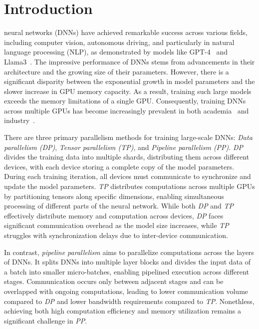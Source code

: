 \section{Introduction}
 neural networks (DNNs) have achieved remarkable success across various fields,
including computer vision, autonomous driving, and particularly in natural language processing (NLP),
as demonstrated by models like GPT-4~\cite{achiam2023gpt} and Llama3~\cite{dubey2024llama}.
The impressive performance of DNNs stems from advancements in their architecture
and the growing size of their parameters.
However, there is a significant disparity between the exponential growth in model parameters
and the slower increase in GPU memory capacity.
As a result, training such large models exceeds the memory limitations of a single GPU.
Consequently, training DNNs across multiple GPUs has become increasingly
prevalent in both academia~\cite{miao2023hetu,zhengAlpaAutomatingInter2022} and industry~\cite{abadiTensorFlowSystemLargeScale2016,paszkePytorchImperativeStyle2019}.

There are three primary parallelism methods for training large-scale DNNs:
\emph{Data parallelism (DP)}, \emph{Tensor parallelism (TP)}, and \emph{Pipeline parallelism (PP)}.
\emph{DP} divides the training data into multiple shards,
distributing them across different devices, with each device storing a complete copy of the model parameters.
During each training iteration, all devices must communicate to synchronize and update the model parameters.
\emph{TP} distributes computations across multiple GPUs by partitioning tensors along specific dimensions,
enabling simultaneous processing of different parts of the neural network.
While both \emph{DP} and \emph{TP} effectively distribute memory and computation across devices,
\emph{DP} faces significant communication overhead as the model size increases,
while \emph{TP} struggles with synchronization delays due to inter-device communication.

In contrast, \emph{pipeline parallelism} aims to parallelize computations across the layers of DNNs.
It splits DNNs into multiple layer blocks and divides the input data of a batch into smaller micro-batches,
enabling pipelined execution across different stages.
Communication occurs only between adjacent stages and can be overlapped with ongoing computations,
leading to lower communication volume compared to \emph{DP} and lower bandwidth requirements compared to \emph{TP}.
Nonethless, achieving both high computation efficiency and memory utilization remains a significant challenge in \emph{PP}.

